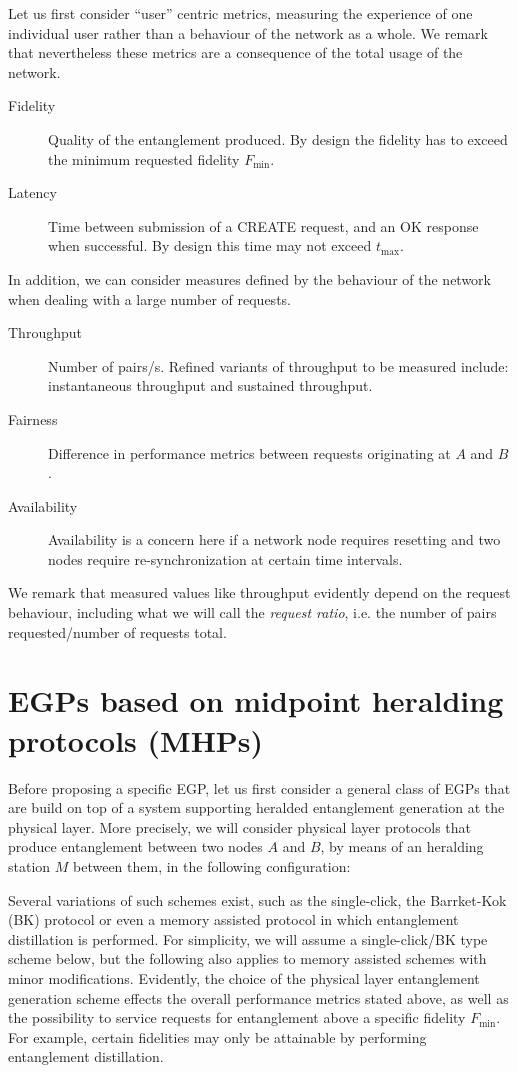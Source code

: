 \documentclass{article}
\begin{document}
Let us first consider ``user'' centric metrics, measuring the experience of one individual user rather than a behaviour of the network as a whole. We remark that nevertheless these metrics
are a consequence of the total usage of the network.
\begin{description}
\item[Fidelity] Quality of the entanglement produced. By design the fidelity has to exceed the minimum requested fidelity $F_{\min}$.
\item[Latency] Time between submission of a CREATE request, and an OK response when successful. By design this time may not exceed $t_{\max}$.
\end{description}
In addition, we can consider measures defined by the behaviour of the network when dealing with a large number of requests.
\begin{description}
\item[Throughput] Number of pairs/s. Refined variants of throughput to be measured include: instantaneous throughput and sustained throughput.
\item[Fairness] Difference in performance metrics between requests originating at $A$ and $B$.
\item[Availability] Availability is a concern here if a network node requires resetting and two nodes require re-synchronization at certain time intervals.
\end{description}
We remark that measured values like throughput evidently depend on the request behaviour, including what we will call the \emph{request ratio}, i.e. the number of pairs requested/number of requests total.

\section{EGPs based on midpoint heralding protocols (MHPs)}
Before proposing a specific EGP, let us first consider a general class of EGPs that are build
on top of a system supporting heralded entanglement generation at the physical layer.
More precisely, we will consider physical layer protocols that  produce entanglement between two nodes $A$ and $B$, by means of an heralding station $M$ between them, in the following configuration:
\smallskip
\begin{sequencediagram}
\end{sequencediagram}

\smallskip
\noindent
Several variations of such schemes exist, such as the single-click, the Barrket-Kok (BK) protocol or even a memory assisted protocol in which entanglement distillation is performed.
For simplicity, we will assume a single-click/BK type scheme below, but the following also applies to memory assisted schemes with minor modifications.
Evidently, the choice of the physical layer entanglement generation scheme effects the overall performance metrics stated above, as well as the possibility to service requests
for entanglement above a specific fidelity $F_{\min}$. For example, certain fidelities may only be attainable by performing entanglement distillation.
\end{document}
